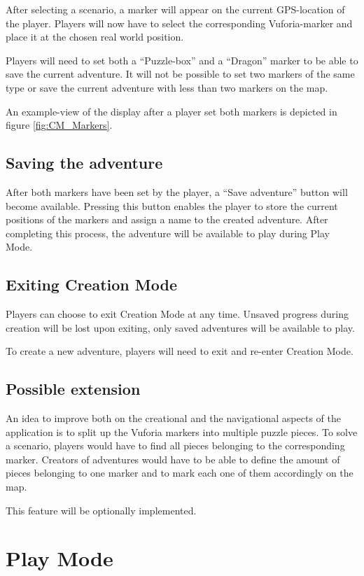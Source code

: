 \documentclass{sigchi-ext}
\begin{document}
After selecting a scenario, a marker will appear on the current GPS-location of the player. Players will now have to select the corresponding Vuforia-marker and place it at the chosen real world position.

Players will need to set both a ``Puzzle-box'' and a ``Dragon'' marker to be able to save the current adventure. It will not be possible to set two markers of the same type or save the current adventure with less than two markers on the map.

An example-view of the display after a player set both markers is depicted in figure \ref{fig:CM_Markers}.

\subsection{Saving the adventure}

After both markers have been set by the player, a ``Save adventure'' button will become available. Pressing this button enables the player to store the current positions of the markers and assign a name to the created adventure. After completing this process, the adventure will be available to play during Play Mode.

\subsection{Exiting Creation Mode}

Players can choose to exit Creation Mode at any time. Unsaved progress during creation will be lost upon exiting, only saved adventures will be available to play.

To create a new adventure, players will need to exit and re-enter Creation Mode.


\subsection{Possible extension}

An idea to improve both on the creational and the navigational aspects of the application is to split up the Vuforia markers into multiple puzzle pieces. To solve a scenario, players would have to find all pieces belonging to the corresponding marker. Creators of adventures would have to be able to define the amount of pieces belonging to one marker and to mark each one of them accordingly on the map.

This feature will be optionally implemented.

\section{Play Mode}
\label{sec:Play}
\end{document}
